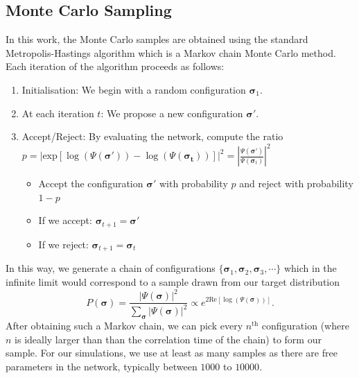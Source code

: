 \documentclass[aps,prl,twocolumn,amsmath,amssymb,superscriptaddress,floatfix]{revtex4-1}
\begin{document}
\begin{widetext}
\subsection{Monte Carlo Sampling}
In this work, the Monte Carlo samples are obtained using the standard Metropolis-Hastings algorithm \cite{Metropolis1953} which is a Markov chain Monte Carlo method. Each iteration of the algorithm proceeds as follows:
\begin{enumerate}
  \item Initialisation: We begin with a random configuration $\boldsymbol{\sigma}_{1}$.
  \item At each iteration $t$: We propose a new configuration $\boldsymbol{\sigma'}$.
  \item Accept/Reject: By evaluating the network, compute the ratio $p = \left| \textrm{exp}[\log(\Psi(\boldsymbol{\sigma'})) - \log(\Psi(\boldsymbol{\sigma_{t}}))] \right|^{2} =\left| \frac{\Psi(\boldsymbol{\sigma'})} {\Psi(\boldsymbol{\sigma}_{t})} \right|^{2}$
  \begin{itemize}
  \item Accept the configuration $\boldsymbol{\sigma'}$ with probability $p$ and reject with probability $1-p$
  \item If we accept: $\boldsymbol{\sigma}_{t+1} = \boldsymbol{\sigma'}$
  \item If we reject: $\boldsymbol{\sigma}_{t+1} = \boldsymbol{\sigma}_{t}$
  \end{itemize}
\end{enumerate}
In this way, we generate a chain of configurations $\lbrace \boldsymbol{\sigma}_{1}, \boldsymbol{\sigma}_{2}, \boldsymbol{\sigma}_{3}, \cdots \rbrace$ which in the infinite limit would correspond to a sample drawn from our target distribution 
\begin{equation}
P(\boldsymbol{\sigma}) = \frac{|\Psi(\boldsymbol{\sigma})|^{2}}{\sum_{\boldsymbol{\sigma}} |\Psi(\boldsymbol{\sigma})|^{2}} \propto e^{2\textrm{Re}[\log(\Psi(\boldsymbol{\sigma}))]}.
\end{equation} 
After obtaining such a Markov chain, we can pick every $n^{\textrm{th}}$ configuration (where $n$ is ideally larger than than the correlation time of the chain) to form our sample. For our simulations, we use at least as many samples as there are free parameters in the network, typically between $1000$ to $10000$.


\end{widetext}
\end{document}
